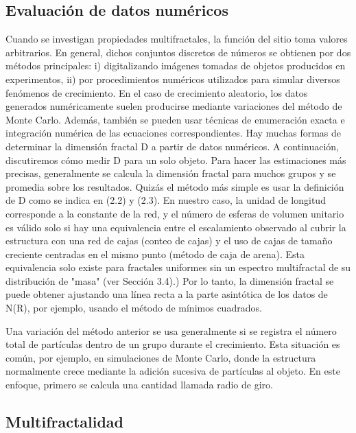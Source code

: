 \documentclass[11pt]{article}
\begin{document}
\subsection{Evaluación de datos numéricos}

Cuando se investigan propiedades multifractales, la función del sitio toma valores arbitrarios. En general, dichos conjuntos discretos de números se obtienen por dos métodos principales: i) digitalizando imágenes tomadas de objetos producidos en experimentos, ii) por procedimientos numéricos utilizados para simular diversos fenómenos de crecimiento. En el caso de crecimiento aleatorio, los datos generados numéricamente suelen producirse mediante variaciones del método de Monte Carlo. Además, también se pueden usar técnicas de enumeración exacta e integración numérica de las ecuaciones correspondientes. Hay muchas formas de determinar la dimensión fractal D a partir de datos numéricos. A continuación, discutiremos cómo medir D para un solo objeto. Para hacer las estimaciones más precisas, generalmente se calcula la dimensión fractal para muchos grupos y se promedia sobre los resultados. Quizás el método más simple es usar la definición de  D como se indica en (2.2) y (2.3). En nuestro caso, la unidad de longitud corresponde a la constante de la red, y el número de esferas de volumen unitario es válido solo si hay una equivalencia entre el escalamiento observado al cubrir la estructura con una red de cajas (conteo de cajas) y el uso de cajas de tamaño creciente centradas en el mismo punto (método de caja de arena). Esta equivalencia solo existe para fractales uniformes sin un espectro multifractal de su distribución de "masa" (ver Sección 3.4).) Por lo tanto, la dimensión fractal se puede obtener ajustando una línea recta a la parte asintótica de los datos de  N(R), por ejemplo, usando el método de mínimos cuadrados.

Una variación del método anterior se usa generalmente si se registra el número total de partículas dentro de un grupo durante el crecimiento. Esta situación es común, por ejemplo, en simulaciones de Monte Carlo, donde la estructura normalmente crece mediante la adición sucesiva de partículas al objeto. En este enfoque, primero se calcula una cantidad llamada radio de giro.

\subsection{Multifractalidad}
\end{document}
